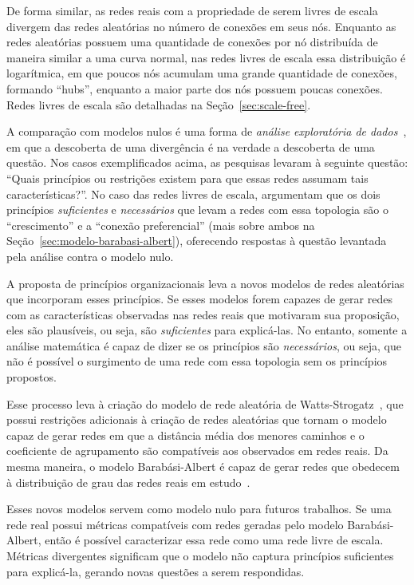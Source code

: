 \documentclass[12pt,a4paper]{article}
\theoremstyle{hypo}
\begin{document}
De forma similar, as redes reais com a propriedade de serem livres de escala divergem das redes aleatórias no número de conexões em seus nós. Enquanto as redes aleatórias possuem uma quantidade de conexões por nó distribuída de maneira similar a uma curva normal, nas redes livres de escala essa distribuição é logarítmica, em que poucos nós acumulam uma grande quantidade de conexões, formando \enquote{hubs}, enquanto a maior parte dos nós possuem poucas conexões. Redes livres de escala são detalhadas na Seção~\ref{sec:scale-free}.

A comparação com modelos nulos é uma forma de \textit{análise exploratória de dados}~\cite{Zweig2016-rb}, em que a descoberta de uma divergência é na verdade a descoberta de uma questão. Nos casos exemplificados acima, as pesquisas levaram à seguinte questão: \enquote{Quais princípios ou restrições existem para que essas redes assumam tais características?}. No caso das redes livres de escala,  argumentam que os dois princípios  \textit{suficientes} e \textit{necessários} que levam a redes com essa topologia são o \enquote{crescimento} e a \enquote{conexão preferencial} (mais sobre ambos na Seção~\ref{sec:modelo-barabasi-albert}), oferecendo respostas à questão levantada pela análise contra o modelo nulo.

A proposta de princípios organizacionais leva a novos modelos de redes aleatórias que incorporam esses princípios. Se esses modelos forem capazes de gerar redes com as características observadas nas redes reais que motivaram sua proposição, eles são plausíveis, ou seja, são \textit{suficientes} para explicá-las. No entanto, somente a análise matemática é capaz de dizer se os princípios são \textit{necessários}, ou seja, que não é possível o surgimento de uma rede com essa topologia sem os princípios propostos.

Esse processo leva à criação do modelo de rede aleatória de Watts-Strogatz~\cite{Watts1998-wt}, que possui restrições adicionais à criação de redes aleatórias que tornam o modelo capaz de gerar redes em que a distância média dos menores caminhos e o coeficiente de agrupamento são compatíveis aos observados em redes reais. Da mesma maneira, o modelo Barabási-Albert é capaz de gerar redes que obedecem à distribuição de grau das redes reais em estudo~\cite{Barabasi1999-sn}.

Esses novos modelos servem como modelo nulo para futuros trabalhos. Se uma rede real possui métricas compatíveis com redes geradas pelo modelo Barabási-Albert, então é possível caracterizar essa rede como uma rede livre de escala. Métricas divergentes significam que o modelo não captura princípios suficientes para explicá-la, gerando novas questões a serem respondidas.
\end{document}
